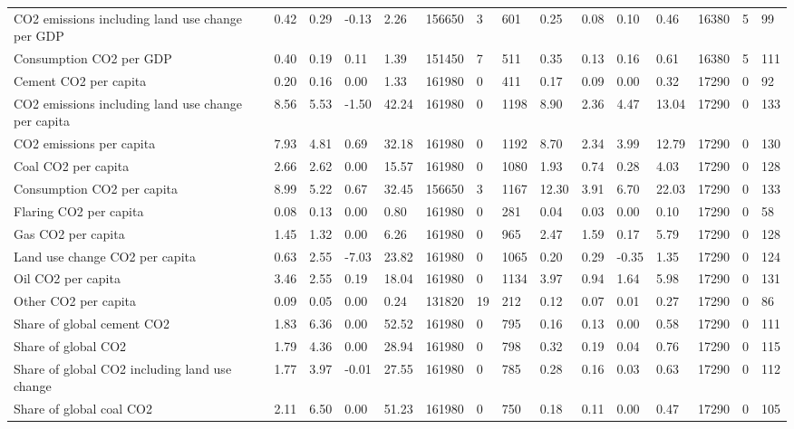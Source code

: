 \begin{longtable}{lllllllllllllll}
CO2 emissions including land use change per GDP & 0.42 & 0.29 & -0.13 & 2.26 & 156650 & 3 & 601 & 0.25 & 0.08 & 0.10 & 0.46 & 16380 & 5 & 99\\
\addlinespace
Consumption CO2 per GDP & 0.40 & 0.19 & 0.11 & 1.39 & 151450 & 7 & 511 & 0.35 & 0.13 & 0.16 & 0.61 & 16380 & 5 & 111\\
Cement CO2 per capita & 0.20 & 0.16 & 0.00 & 1.33 & 161980 & 0 & 411 & 0.17 & 0.09 & 0.00 & 0.32 & 17290 & 0 & 92\\
CO2 emissions including land use change per capita & 8.56 & 5.53 & -1.50 & 42.24 & 161980 & 0 & 1198 & 8.90 & 2.36 & 4.47 & 13.04 & 17290 & 0 & 133\\
CO2 emissions per capita & 7.93 & 4.81 & 0.69 & 32.18 & 161980 & 0 & 1192 & 8.70 & 2.34 & 3.99 & 12.79 & 17290 & 0 & 130\\
Coal CO2 per capita & 2.66 & 2.62 & 0.00 & 15.57 & 161980 & 0 & 1080 & 1.93 & 0.74 & 0.28 & 4.03 & 17290 & 0 & 128\\
\addlinespace
Consumption CO2 per capita & 8.99 & 5.22 & 0.67 & 32.45 & 156650 & 3 & 1167 & 12.30 & 3.91 & 6.70 & 22.03 & 17290 & 0 & 133\\
Flaring CO2 per capita & 0.08 & 0.13 & 0.00 & 0.80 & 161980 & 0 & 281 & 0.04 & 0.03 & 0.00 & 0.10 & 17290 & 0 & 58\\
Gas CO2 per capita & 1.45 & 1.32 & 0.00 & 6.26 & 161980 & 0 & 965 & 2.47 & 1.59 & 0.17 & 5.79 & 17290 & 0 & 128\\
Land use change CO2 per capita & 0.63 & 2.55 & -7.03 & 23.82 & 161980 & 0 & 1065 & 0.20 & 0.29 & -0.35 & 1.35 & 17290 & 0 & 124\\
Oil CO2 per capita & 3.46 & 2.55 & 0.19 & 18.04 & 161980 & 0 & 1134 & 3.97 & 0.94 & 1.64 & 5.98 & 17290 & 0 & 131\\
\addlinespace
Other CO2 per capita & 0.09 & 0.05 & 0.00 & 0.24 & 131820 & 19 & 212 & 0.12 & 0.07 & 0.01 & 0.27 & 17290 & 0 & 86\\
Share of global cement CO2 & 1.83 & 6.36 & 0.00 & 52.52 & 161980 & 0 & 795 & 0.16 & 0.13 & 0.00 & 0.58 & 17290 & 0 & 111\\
Share of global CO2 & 1.79 & 4.36 & 0.00 & 28.94 & 161980 & 0 & 798 & 0.32 & 0.19 & 0.04 & 0.76 & 17290 & 0 & 115\\
Share of global CO2 including land use change & 1.77 & 3.97 & -0.01 & 27.55 & 161980 & 0 & 785 & 0.28 & 0.16 & 0.03 & 0.63 & 17290 & 0 & 112\\
Share of global coal CO2 & 2.11 & 6.50 & 0.00 & 51.23 & 161980 & 0 & 750 & 0.18 & 0.11 & 0.00 & 0.47 & 17290 & 0 & 105\\

\end{longtable}
